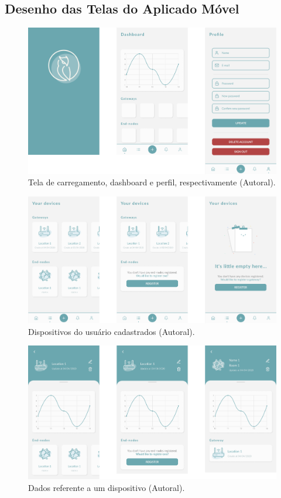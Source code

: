 \begin{apendicesenv}
  \partapendices  %

  \chapter{Desenho das Telas do Aplicado Móvel}
  \label{ape:app-screens}
  \begin{figure}[H]
    \centering
    \includegraphics[width=.80\textwidth]{assets/app-screens-1.png} 
    \caption{Tela de carregamento, dashboard e perfil, respectivamente (Autoral).}
    \label{fig:app-screens-1} 
  \end{figure}

  \begin{figure}[H]
    \centering
    \includegraphics[width=.80\textwidth]{assets/app-screens-2.png} 
    \caption{Dispositivos do usuário cadastrados (Autoral).}
    \label{fig:app-screens-2} 
  \end{figure}

  \begin{figure}[H]
    \centering
    \includegraphics[width=.80\textwidth]{assets/app-screens-3.png} 
    \caption{Dados referente a um dispositivo (Autoral).}
    \label{fig:app-screens-3} 
  \end{figure}


\end{apendicesenv}
